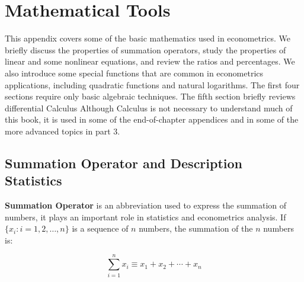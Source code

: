 \documentclass[11pt]{elegantbook}
\begin{document}
\nocite{en2,en3}

\printbibliography[heading=bibintoc, title=\ebibname]
\appendix


\chapter{Mathematical Tools}

This appendix covers some of the basic mathematics used in econometrics. We briefly discuss the properties of summation operators, study the properties of linear and some nonlinear equations, and review the ratios and percentages. We also introduce some special functions that are common in econometrics applications, including quadratic functions and natural logarithms. The first four sections require only basic algebraic techniques. The fifth section briefly reviews differential Calculus Although Calculus is not necessary to understand much of this book, it is used in some of the end-of-chapter appendices and in some of the more advanced topics in part 3.

\section{Summation Operator and Description Statistics}

\textbf{Summation Operator} is an abbreviation used to express the summation of numbers, it plays an important role in statistics and econometrics analysis. If $\{x_i: i=1, 2, \ldots, n\}$ is a sequence of $n$ numbers, the summation of the $n$ numbers is:

\begin{equation}
\sum_{i=1}^n x_i \equiv x_1 + x_2 +\cdots + x_n
\end{equation}
\end{document}
